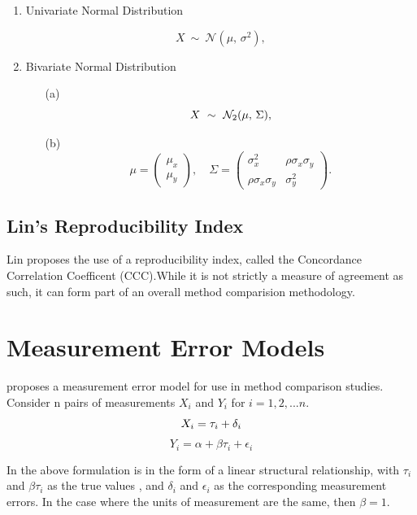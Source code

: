 \documentclass[12pt, a4paper]{report}
\theoremstyle{plain}
\theoremstyle{definition}
\theoremstyle{remark}
\begin{document}
	\bigskip
	
	\begin{enumerate}
		\item Univariate Normal Distribution
		
		\[
		X\ \sim\ \mathcal{N}(\mu,\, \sigma^2),
		\]
		
		\item Bivariate Normal Distribution
		
		\begin{itemize}
			\item[(a)] \[  X\ \sim\ \mathcal{N}_2(\mu,\, \Sigma), \vspace{1cm}\]
			\item[(b)] \[    \mu = \begin{pmatrix} \mu_x \\ \mu_y \end{pmatrix}, \quad
			\Sigma = \begin{pmatrix} \sigma_x^2 & \rho \sigma_x \sigma_y \\
			\rho \sigma_x \sigma_y  & \sigma_y^2 \end{pmatrix}.\]
		\end{itemize}
	\end{enumerate}
	
	
	
	\subsection{Lin's Reproducibility Index} Lin proposes the use of a
	reproducibility index, called the Concordance Correlation
	Coefficent (CCC).While it is not strictly a measure of agreement
	as such, it can form part of an overall method comparision
	methodology.
\section{Measurement Error Models}

\citet{DunnSEME} proposes a measurement error model for use in
method comparison studies. Consider n pairs of measurements
$X_{i}$ and $Y_{i}$ for $i=1,2,...n$.
\begin{equation}
X_{i} = \tau_{i}+\delta_{i}\\
\end{equation}
\begin{equation}
Y_{i} = \alpha +\beta\tau_{i}+\epsilon_{i} \nonumber
\end{equation}

In the above formulation is in the form of a linear structural
relationship, with $\tau_{i}$ and $\beta\tau_{i}$ as the true
values , and $\delta_{i}$ and $\epsilon_{i}$ as the corresponding
measurement errors. In the case where the units of measurement are
the same, then $\beta =1$.
\end{document}
